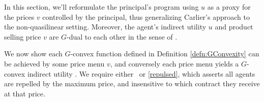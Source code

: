 In this section,
we'll reformulate the 
principal's program using $u$ as a proxy for the prices $v$ controlled
by the principal,  thus generalizing Carlier's approach \cite{Carlier01} to the non-quasilinear setting. Moreover, the agent's indirect utility $u$ and product selling price $v$ are $G$-dual to each other in the sense of \cite{Trudinger14}.\medskip

%	
	

		
		
%			
%			

{\color{blue}			
%			
			
}
					
	We now show each $G$-convex function defined in Definition \ref{defn:GConvexity} can be achieved by 
	some price menu $v$,  and conversely each price menu yields a $G$-convex indirect utility \cite{Trudinger14}.
	We require either \Gfive\ or \eqref{repulsed}, which asserts
	all agents are repelled by the maximum price,  and insensitive to which contract they receive at that price.\medskip
					
